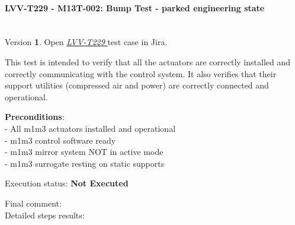 \documentclass[SE,lsstdraft,STR,toc]{lsstdoc}
\begin{document}
\paragraph{ LVV-T229 - M13T-002: Bump Test - parked engineering state }\mbox{}\\

Version \textbf{1}.
Open  \href{https://jira.lsstcorp.org/secure/Tests.jspa#/testCase/LVV-T229}{\textit{ LVV-T229 } }
test case in Jira.

This test is intended to verify that all the actuators are correctly
installed and correctly communicating with the control system. It also
verifies that their support utilities (compressed air and power) are
correctly connected and operational.\texttt{}

\textbf{ Preconditions}:\\
- All m1m3 actuators installed and operational\\
- m1m3 control software ready\\
- m1m3 mirror system NOT in active mode\\
- m1m3 surrogate resting on static supports

Execution status: {\bf Not Executed }

Final comment:\\


Detailed steps results:
\end{document}
